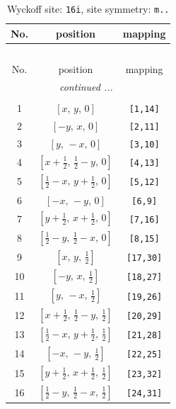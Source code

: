 \documentclass[fleqn,8pt]{jsarticle}
\begin{document}
\begin{longtable}{ccc}
\caption{Wyckoff site: {\tt 16i}, site symmetry: {\tt m..}}
 \\
 \hline \hline
No. & position & mapping \\ \hline \endfirsthead

\multicolumn{2}{l}{\tablename\ \thetable{}} \\
 \hline \hline
No. & position & mapping \\ \hline \endhead

 \hline \hline
\multicolumn{2}{r}{\footnotesize\it continued ...} \\ \endfoot

 \hline \hline
\multicolumn{2}{r}{} \\ \endlastfoot

1 & $\left[ x,\, y,\, 0 \right]$ & {\tt [1,14]} \\ \hline
2 & $\left[ - y,\, x,\, 0 \right]$ & {\tt [2,11]} \\ \hline
3 & $\left[ y,\, - x,\, 0 \right]$ & {\tt [3,10]} \\ \hline
4 & $\left[ x + \frac{1}{2},\, \frac{1}{2} - y,\, 0 \right]$ & {\tt [4,13]} \\ \hline
5 & $\left[ \frac{1}{2} - x,\, y + \frac{1}{2},\, 0 \right]$ & {\tt [5,12]} \\ \hline
6 & $\left[ - x,\, - y,\, 0 \right]$ & {\tt [6,9]} \\ \hline
7 & $\left[ y + \frac{1}{2},\, x + \frac{1}{2},\, 0 \right]$ & {\tt [7,16]} \\ \hline
8 & $\left[ \frac{1}{2} - y,\, \frac{1}{2} - x,\, 0 \right]$ & {\tt [8,15]} \\ \hline
9 & $\left[ x,\, y,\, \frac{1}{2} \right]$ & {\tt [17,30]} \\ \hline
10 & $\left[ - y,\, x,\, \frac{1}{2} \right]$ & {\tt [18,27]} \\ \hline
11 & $\left[ y,\, - x,\, \frac{1}{2} \right]$ & {\tt [19,26]} \\ \hline
12 & $\left[ x + \frac{1}{2},\, \frac{1}{2} - y,\, \frac{1}{2} \right]$ & {\tt [20,29]} \\ \hline
13 & $\left[ \frac{1}{2} - x,\, y + \frac{1}{2},\, \frac{1}{2} \right]$ & {\tt [21,28]} \\ \hline
14 & $\left[ - x,\, - y,\, \frac{1}{2} \right]$ & {\tt [22,25]} \\ \hline
15 & $\left[ y + \frac{1}{2},\, x + \frac{1}{2},\, \frac{1}{2} \right]$ & {\tt [23,32]} \\ \hline
16 & $\left[ \frac{1}{2} - y,\, \frac{1}{2} - x,\, \frac{1}{2} \right]$ & {\tt [24,31]} \\
\end{longtable}
\end{document}
